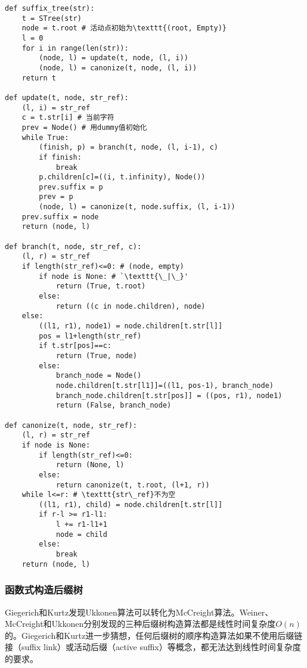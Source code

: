 \documentclass{ctexart}
\begin{document}
\lstset{escapeinside=`'}
\begin{lstlisting}
def suffix_tree(str):
    t = STree(str)
    node = t.root # 活动点初始为\texttt{(root, Empty)}
    l = 0
    for i in range(len(str)):
        (node, l) = update(t, node, (l, i))
        (node, l) = canonize(t, node, (l, i))
    return t

def update(t, node, str_ref):
    (l, i) = str_ref
    c = t.str[i] # 当前字符
    prev = Node() # 用dummy值初始化
    while True:
        (finish, p) = branch(t, node, (l, i-1), c)
        if finish:
            break
        p.children[c]=((i, t.infinity), Node())
        prev.suffix = p
        prev = p
        (node, l) = canonize(t, node.suffix, (l, i-1))
    prev.suffix = node
    return (node, l)

def branch(t, node, str_ref, c):
    (l, r) = str_ref
    if length(str_ref)<=0: # (node, empty)
        if node is None: # `\texttt{\_|\_}'
            return (True, t.root)
        else:
            return ((c in node.children), node)
    else:
        ((l1, r1), node1) = node.children[t.str[l]]
        pos = l1+length(str_ref)
        if t.str[pos]==c:
            return (True, node)
        else:
            branch_node = Node()
            node.children[t.str[l1]]=((l1, pos-1), branch_node)
            branch_node.children[t.str[pos]] = ((pos, r1), node1)
            return (False, branch_node)

def canonize(t, node, str_ref):
    (l, r) = str_ref
    if node is None:
        if length(str_ref)<=0:
            return (None, l)
        else:
            return canonize(t, t.root, (l+1, r))
    while l<=r: # \texttt{str\_ref}不为空
        ((l1, r1), child) = node.children[t.str[l]]
        if r-l >= r1-l1:
            l += r1-l1+1
            node = child
        else:
            break
    return (node, l)
\end{lstlisting}
\lstset{escapeinside=,}

\subsubsection{函数式构造后缀树}

Giegerich和Kurtz发现Ukkonen算法可以转化为McCreight算法\cite{GieKur97}。Weiner、McCreight和Ukkonen分别发现的三种后缀树构造算法都是线性时间复杂度$O(n)$的。Giegerich和Kurtz进一步猜想，任何后缀树的顺序构造算法如果不使用后缀链接（suffix link）或活动后缀（active suffix）等概念，都无法达到线性时间复杂度的要求。
\end{document}
